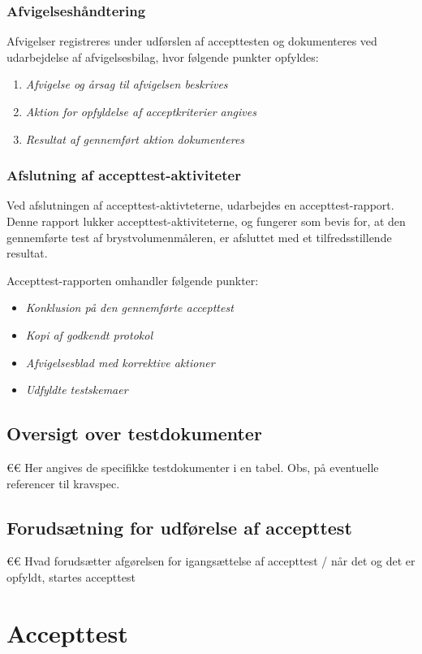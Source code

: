 			\subsubsection{Afvigelseshåndtering}	
			Afvigelser registreres under udførslen af accepttesten og dokumenteres ved udarbejdelse af afvigelsesbilag, hvor følgende punkter opfyldes:
			
			\begin{enumerate}[label=\alph*)]
				\item \textit{Afvigelse og årsag til afvigelsen beskrives}
				\item \textit{Aktion for opfyldelse af acceptkriterier angives}
				\item \textit{Resultat af gennemført aktion dokumenteres}	
			\end{enumerate}
			
			\subsubsection{Afslutning af accepttest-aktiviteter}
			Ved afslutningen af accepttest-aktivteterne, udarbejdes en accepttest-rapport. Denne rapport lukker accepttest-aktiviteterne, og fungerer som bevis for, at den gennemførte test af brystvolumenmåleren, er afsluttet med et tilfredsstillende resultat. 
			
			Accepttest-rapporten omhandler følgende punkter: 
			\begin{itemize}
				\item \textit{Konklusion på den gennemførte accepttest}
				\item \textit{Kopi af godkendt protokol}
				\item \textit{Afvigelsesblad med korrektive aktioner}
				\item \textit{Udfyldte testskemaer}
			\end{itemize}
			
		\subsection{Oversigt over testdokumenter}
		€€ Her angives de specifikke testdokumenter i en tabel. Obs, på eventuelle referencer til kravspec. 
		
		\subsection{Forudsætning for udførelse af accepttest}
		€€ Hvad forudsætter afgørelsen for igangsættelse af accepttest / når det og det er opfyldt, startes accepttest 
		
		\section{Accepttest}
		
				
	
	
		
	
		
	
		
